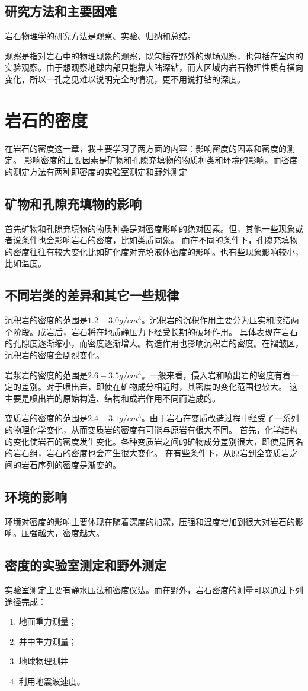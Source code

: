\documentclass[hyperref,UTF-8,twoside]{ctexart}
\begin{document}
\subsection{研究方法和主要困难}
岩石物理学的研究方法是观察、实验、归纳和总结。

观察是指对岩石中的物理现象的观察，既包括在野外的现场观察，也包括在室内的实验观察。由于想观察地球内部只能靠大陆深钻，而大区域内岩石物理性质有横向变化，所以一孔之见难以说明完全的情况，更不用说打钻的深度。
\section{岩石的密度}
在岩石的密度这一章，我主要学习了两方面的内容：影响密度的因素和密度的测定。
影响密度的主要因素是矿物和孔隙充填物的物质种类和环境的影响。而密度的测定方法有两种即密度的实验室测定和野外测定
\subsection{矿物和孔隙充填物的影响}
首先矿物和孔隙充填物的物质种类是对密度影响的绝对因素。但，其他一些现象或者说条件也会影响岩石的密度，比如类质同象。
而在不同的条件下，孔隙充填物的密度往往有较大变化比如矿化度对充填液体密度的影响。也有些现象影响较小，比如温度。
\subsection{不同岩类的差异和其它一些规律}
沉积岩的密度的范围是$1.2-3.0g/cm^{3}$。沉积岩的沉积作用主要分为压实和胶结两个阶段。成岩后，岩石将在地质静压力下经受长期的破坏作用。
具体表现在岩石的孔隙度逐渐缩小，而密度逐渐增大。构造作用也影响沉积岩的密度。在褶皱区，沉积岩的密度会剧烈变化。

岩浆岩的密度的范围是$2.6-3.5g/cm^{3}$。一般来看，侵入岩和喷出岩的密度有着一定的差别。对于喷出岩，即使在矿物成分相近时，其密度的变化范围也较大。
这主要是喷出岩的原始构造、结构和成岩作用不同而造成的。

变质岩的密度的范围是$2.4-3.1g/cm^{3}$。由于岩石在变质改造过程中经受了一系列的物理化学变化，从而变质岩的密度有可能与原岩有很大不同。
首先，化学结构的变化使岩石的密度发生变化。各种变质岩之间的矿物成分差别很大，即使是同名的岩石组，岩石的密度也会产生很大变化。
在有些条件下，从原岩到全变质岩之间的岩石序列的密度是渐变的。
\subsection{环境的影响}
环境对密度的影响主要体现在随着深度的加深，压强和温度增加到很大对岩石的影响。压强越大，密度越大。
\subsection{密度的实验室测定和野外测定}
实验室测定主要有静水压法和密度仪法。而在野外，岩石密度的测量可以通过下列途径完成：
\begin{enumerate}
\item 地面重力测量；
\item 井中重力测量；
\item 地球物理测井
\item 利用地震波速度。
\end{enumerate}
\end{document}
